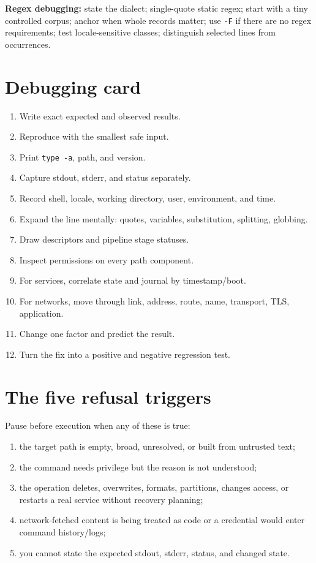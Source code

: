 \documentclass[11pt,oneside,openany]{book}
\begin{document}
\textbf{Regex debugging:} state the dialect; single-quote static regex; start with a tiny controlled corpus; anchor when whole records matter; use \texttt{-F} if there are no regex requirements; test locale-sensitive classes; distinguish selected lines from occurrences.

\section{Debugging card}
\begin{enumerate}
  \item Write exact expected and observed results.
  \item Reproduce with the smallest safe input.
  \item Print \texttt{type -a}, path, and version.
  \item Capture stdout, stderr, and status separately.
  \item Record shell, locale, working directory, user, environment, and time.
  \item Expand the line mentally: quotes, variables, substitution, splitting, globbing.
  \item Draw descriptors and pipeline stage statuses.
  \item Inspect permissions on every path component.
  \item For services, correlate state and journal by timestamp/boot.
  \item For networks, move through link, address, route, name, transport, TLS, application.
  \item Change one factor and predict the result.
  \item Turn the fix into a positive and negative regression test.
\end{enumerate}

\section{The five refusal triggers}
Pause before execution when any of these is true:
\begin{enumerate}
  \item the target path is empty, broad, unresolved, or built from untrusted text;
  \item the command needs privilege but the reason is not understood;
  \item the operation deletes, overwrites, formats, partitions, changes access, or restarts a real service without recovery planning;
  \item network-fetched content is being treated as code or a credential would enter command history/logs;
  \item you cannot state the expected stdout, stderr, status, and changed state.
\end{enumerate}
\end{document}
